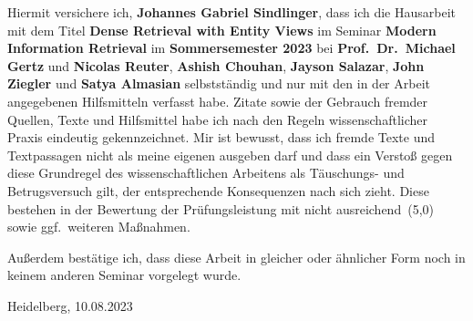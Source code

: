\documentclass[
     11pt,         %
     a4paper,      %
     oneside,
     ]{article}
\newcommand{\mytitle}{Dense Retrieval with Entity Views}
\newcommand{\myauthor}{Johannes Gabriel Sindlinger}
\newcommand{\myseminar}{Modern Information Retrieval }
\newcommand{\mydozent}{Prof.~Dr.~Michael Gertz}
\newcommand{\mydozentTwo}{Nicolas Reuter}
\newcommand{\mydozentThree}{Ashish Chouhan}
\newcommand{\mydozentFour}{Jayson Salazar}
\newcommand{\mydozentFive}{John Ziegler}
\newcommand{\mydozentSix}{Satya Almasian}
\begin{document}
\thispagestyle{empty}
\vspace*{100pt}
Hiermit versichere ich, \textbf{\myauthor}, dass ich die Hausarbeit mit dem Titel \textbf{\mytitle}
im Seminar \textbf{\myseminar}
im \textbf{Sommersemester 2023} bei \textbf{\mydozent} und
\textbf{\mydozentTwo},
\textbf{\mydozentThree}, \textbf{\mydozentFour}, \textbf{\mydozentFive} und \textbf{\mydozentSix} 
selbstständig und nur mit den in der Arbeit angegebenen Hilfsmitteln verfasst habe.
Zitate sowie der Gebrauch fremder Quellen, Texte und Hilfsmittel habe ich nach den
Regeln wissenschaftlicher Praxis eindeutig gekennzeichnet. 
Mir ist bewusst, dass ich
fremde Texte und Textpassagen nicht als meine eigenen ausgeben darf und dass ein
Verstoß gegen diese Grundregel des wissenschaftlichen Arbeitens als Täuschungs- und
Betrugsversuch gilt, der entsprechende Konsequenzen nach sich zieht. Diese bestehen
in der Bewertung der Prüfungsleistung mit \glqq nicht ausreichend\grqq\ (5,0) sowie ggf.\ weiteren
Maßnahmen.

Außerdem bestätige ich, dass diese Arbeit in gleicher oder ähnlicher Form noch in keinem anderen Seminar vorgelegt wurde.
\vspace*{50pt}

Heidelberg, 10.08.2023 \hspace{2cm} \underline{\phantom{space for signature}}

\newpage


\tableofcontents
\newpage












\newpage
{}


\end{document}

